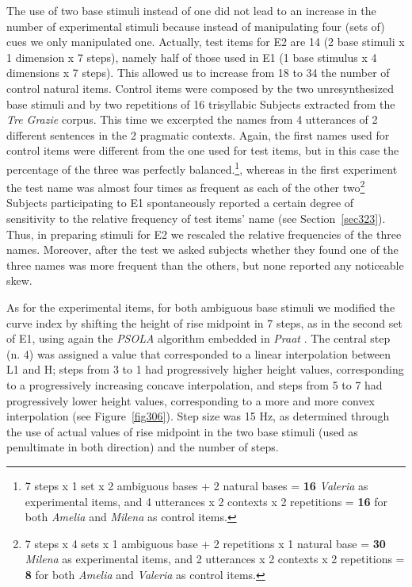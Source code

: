 The use of two base stimuli instead of one did not lead to an increase in the number of experimental stimuli because instead of manipulating four (sets of) cues we only manipulated one. Actually, test items for E2 are 14 (2 base stimuli x 1 dimension x 7 steps), namely half of those used in E1 (1 base stimulus x 4 dimensions x 7 steps). This allowed us to increase from 18 to 34 the number of control natural items. Control items were composed by the two unresynthesized base stimuli and by two repetitions of 16 trisyllabic Subjects extracted from the \textit{Tre Grazie} corpus. This time we excerpted the names from 4 utterances of 2 different sentences in the 2 pragmatic contexts. Again, the first names used for control items were different from the one used for test items, but in this case the percentage of the three was perfectly balanced.\footnote{7 steps x 1 set x 2 ambiguous bases + 2 natural bases = \textbf{16} \textit{Valeria} as experimental items, and 4 utterances x 2 contexts x 2 repetitions = \textbf{16} for both \textit{Amelia} and \textit{Milena} as control items.}, whereas in the first experiment the test name was almost four times as frequent as each of the other two\footnote{7 steps x 4 sets x 1 ambiguous base + 2 repetitions x 1 natural base = \textbf{30} \textit{Milena} as experimental items, and 2 utterances x 2 contexts x 2 repetitions = \textbf{8} for both \textit{Amelia} and \textit{Valeria} as control items.} Subjects participating to E1 spontaneously reported a certain degree of sensitivity to the relative frequency of test items' name (see Section~\ref{sec323}). Thus, in preparing stimuli for E2 we rescaled the relative frequencies of the three names. Moreover, after the test we asked subjects whether they found one of the three names was more frequent than the others, but none reported any noticeable skew.

As for the experimental items, for both ambiguous base stimuli we modified the curve index by shifting the height of rise midpoint in 7 steps, as in the second set of E1, using again the \textit{PSOLA} algorithm \citep{moulines1990pitchsyncronous} embedded in \textit{Praat} \citep{boersma2008praat}. The central step (n. 4) was assigned a value that corresponded to a linear interpolation between L1 and H; steps from 3 to 1 had progressively higher height values, corresponding to a progressively increasing concave interpolation, and steps from 5 to 7 had progressively lower height values, corresponding to a more and more convex interpolation (see Figure~\ref{fig306}). Step size was 15 Hz, as determined through the use of actual values of rise midpoint in the two base stimuli (used as penultimate in both direction) and the number of steps.

